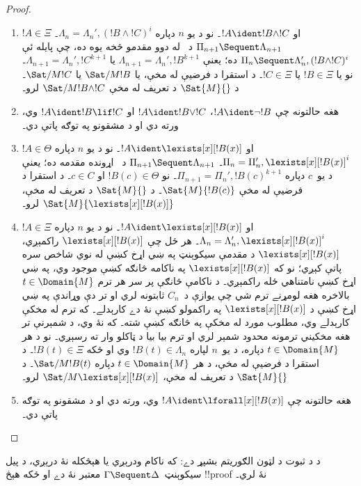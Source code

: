 \documentclass[../../../include/open-logic-section]{subfiles}
\begin{document}
\begin{proof}
\begin{enumerate}
  \item $!A \in \Xi$ او $!A \ident !B \land !C$۔ نو د يو
  $n$ دپاره $\Lambda_n = \Lambda_n', (!B \land !C)^i$۔
  $\Pi_{n+1} \Sequent \Lambda_{n+1}$ د~\RightR{\land} له
  دوو مقدمو څخه يوه ده، چې پايله ئې
  $\Pi_n \Sequent \Lambda'_n, (!B \land !C)^i$ ده؛ يعنې
  $\Lambda_{n+1} = \Lambda_n', !B^{k+1}$ يا
  $\Lambda_{n+1} = \Lambda_n', !C^{k+1}$۔ نو يا $!B \in \Xi$ يا
  $!C \in \Xi$۔ د استقرا د فرضيې له مخې، يا $\Sat/{M}{!B}$
  يا $\Sat/{M}{!C}$۔ د $\Sat{M}{}$ د تعريف له مخې
  $\Sat/{M}{!B \land !C}$ لرو۔

  \item هغه حالتونه چې $!A \ident \lnot !B$،
  $!A \ident !B \lor !C$ او $!A \ident !B \lif !C$ وي، ورته
  دي او د مشقونو په توګه پاتې دي۔

  \item $!A \in \Theta$ او $!A \ident \lexists[x][!B(x)]$۔
  نو د يو $n$ دپاره $\Pi_n = \Pi_n', \lexists[x][!B(x)]^i$۔
  $\Pi_{n+1} \Sequent \Lambda_{n+1}$ د~\LeftR{\lexists}
  اړونده مقدمه ده؛ يعنې د يو~$c$ دپاره
  $\Pi_{n+1} = \Pi_n', !B(c)^{k+1}$۔ نو $!B(c) \in \Theta$ او
  $c \in C$۔ د استقرا د فرضيې له مخې $\Sat{M}{!B(c)}$۔ د
  $\Sat{M}{}$ د تعريف له مخې، $\Sat{M}{\lexists[x][!B(x)]}$
  لرو۔

  \item $!A \in \Xi$ او $!A \ident \lexists[x][!B(x)]$۔ نو
  د يو $n$ دپاره $\Lambda_n = \Lambda_n', \lexists[x][!B(x)]^i$۔
  هر ځل چې $\lexists[x][!B(x)]$ راکمېږي،
  $\lexists[x][!B(x)]$ د مقدمې سيکوېنټ په ښي اړخ کښې له نوي
  شاخص سره پاتې کېږي؛ نو که $\lexists[x][!B(x)]$ په ناکامه څانګه کښې موجود وي،
  په ښي اړخ کښې نامتناهي ځله راکمېږي۔ د ناکامې څانګې پر
  سر هر ترم $t \in \Domain{M}$ بالاخره هغه لومړنے ترم شي
  چې يوازې د~$C_n$ ثابتونه لري او تر دې وړاندې په ښي اړخ
  کښې د $\lexists[x][!B(x)]$ په راکمولو کښې نۀ دے کارېدلے۔ که ترم له مخکې کارېدلے وي، مطلوب مورد له مخکې په څانګه کښې شته۔ که نۀ وي، د شمېرنې تر هغه مخکيني ترمونه محدود شمېر لري او ترم بيا بيا د ټاکلو وار ته رسېږي۔
  نو د هر $t \in \Domain{M}$ دپاره، د يو~$n$ لپاره
  $!B(t) \in \Lambda_n$ وي او ځکه $!B(t) \in \Xi$۔ د استقرا
  د فرضيې له مخې، د هر $t \in \Domain{M}$ دپاره
  $\Sat/{M}{!B(t)}$۔ د $\Sat{M}{}$ د تعريف له مخې،
  $\Sat/{M}{\lexists[x][!B(x)]}$ لرو۔

  \item هغه حالتونه چې $!A \ident \lforall[x][!B(x)]$ وي،
  ورته دي او د مشقونو په توګه پاتې دي۔
\end{enumerate}
\end{proof}

\begin{cor} د  د ثبوت د
لټون الګوريتم بشپړ دے: که ناکام ودرېږي يا هېڅکله نۀ
درېږي، د پيل سيکوېنټ~$\Gamma \Sequent \Delta$ معتبر نۀ دے
او ځکه هېڅ !!{proof} نۀ لري۔
\end{cor}
\end{document}
